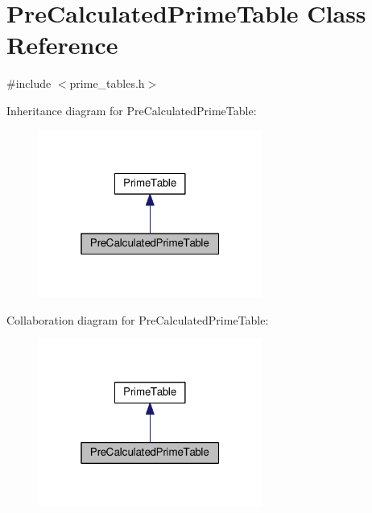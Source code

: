 \hypertarget{class_pre_calculated_prime_table}{}\section{Pre\+Calculated\+Prime\+Table Class Reference}
\label{class_pre_calculated_prime_table}


{\ttfamily \#include $<$prime\+\_\+tables.\+h$>$}



Inheritance diagram for Pre\+Calculated\+Prime\+Table\+:
\nopagebreak
\begin{figure}[H]
\begin{center}
\leavevmode
\includegraphics[width=208pt]{class_pre_calculated_prime_table__inherit__graph}
\end{center}
\end{figure}


Collaboration diagram for Pre\+Calculated\+Prime\+Table\+:
\nopagebreak
\begin{figure}[H]
\begin{center}
\leavevmode
\includegraphics[width=208pt]{class_pre_calculated_prime_table__coll__graph}
\end{center}
\end{figure}
